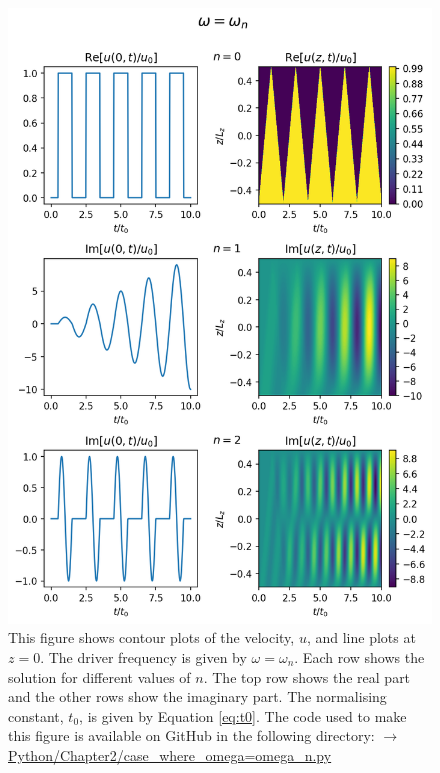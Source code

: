 \begin{figure}
    \centering
    \vspace{-20pt}
    \includegraphics[width=\textwidth,height=0.85\textheight,keepaspectratio]{figures/chapter02/case_where_omega=omega_n_u.png}
    \vspace{-10pt}
    \caption{This figure shows contour plots of the velocity, $u$, and line plots at $z=0$. The driver frequency is given by $\omega=\omega_n$. Each row shows the solution for different values of $n$. The top row shows the real part and the other rows show the imaginary part. The normalising constant, $t_0$, is given by Equation \eqref{eq:t0}. The code used to make this figure is available on GitHub in the following directory:\newline
    \href{https://github.com/aleksyprok/apkp_thesis/blob/main/Python/Chapter2/case_where_omega\%3Domega_n.py}{$\rightarrow$ Python/Chapter2/case\_where\_omega=omega\_n.py}
    }
    \label{fig:case_where_omega=omega_n_u}
    \vspace{-30pt}
\end{figure}

